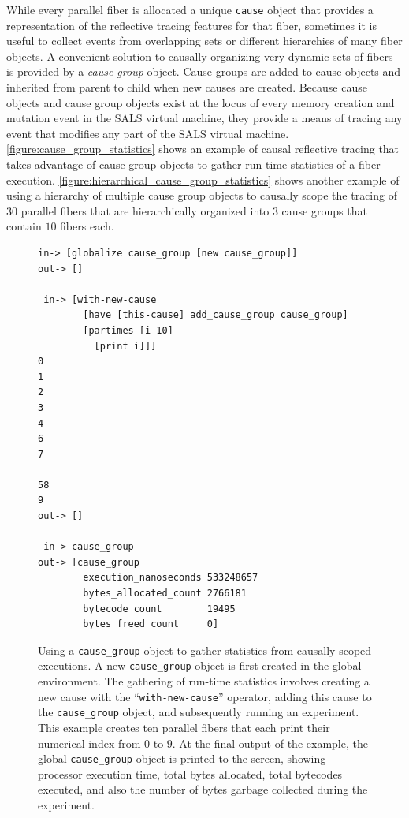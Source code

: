 While every parallel fiber is allocated a unique {\tt{cause}} object
that provides a representation of the reflective tracing features for
that fiber, sometimes it is useful to collect events from overlapping
sets or different hierarchies of many fiber objects.  A convenient
solution to causally organizing very dynamic sets of fibers is
provided by a {\emph{cause group}} object.  Cause groups are added to
cause objects and inherited from parent to child when new causes are
created.  Because cause objects and cause group objects exist at the
locus of every memory creation and mutation event in the SALS virtual
machine, they provide a means of tracing any event that modifies any
part of the SALS virtual machine.
{\mbox{\autoref{figure:cause_group_statistics}}} shows an example of
causal reflective tracing that takes advantage of cause group objects
to gather run-time statistics of a fiber execution.
{\mbox{\autoref{figure:hierarchical_cause_group_statistics}}} shows
another example of using a hierarchy of multiple cause group objects
to causally scope the tracing of $30$ parallel fibers that are
hierarchically organized into $3$ cause groups that contain $10$
fibers each.
\begin{figure}[h]
\centering
{\scriptsize
\begin{Verbatim}[frame=single]
 in-> [globalize cause_group [new cause_group]]
out-> []

 in-> [with-new-cause
        [have [this-cause] add_cause_group cause_group]
        [partimes [i 10]
          [print i]]]
0
1
2
3
4
6
7

58
9
out-> []

 in-> cause_group
out-> [cause_group
        execution_nanoseconds 533248657
        bytes_allocated_count 2766181
        bytecode_count        19495
        bytes_freed_count     0]
\end{Verbatim}
}
\caption[Using a {\tt{cause\_group}} object to gather statistics from
  causally scoped executions.]{Using a {\tt{cause\_group}} object to
  gather statistics from causally scoped executions.  A new
  {\tt{cause\_group}} object is first created in the global
  environment.  The gathering of run-time statistics involves creating
  a new cause with the ``{\tt{with-new-cause}}'' operator, adding this
  cause to the {\tt{cause\_group}} object, and subsequently running an
  experiment.  This example creates ten parallel fibers that each
  print their numerical index from $0$ to $9$.  At the final output of
  the example, the global {\tt{cause\_group}} object is printed to the
  screen, showing processor execution time, total bytes allocated,
  total bytecodes executed, and also the number of bytes garbage
  collected during the experiment.}
\label{figure:cause_group_statistics}
\end{figure}
